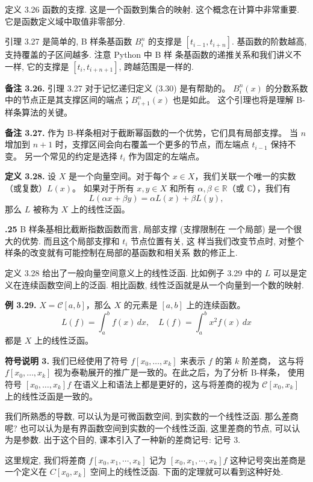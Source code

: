 \documentclass[a4paper]{ctexart}
\newcommand{\remark}[1]
{\noindent {\bf Remark {#1}}}
\begin{document}
{定义 3.26 函数的支撑. 这是一个函数到集合的映射. 这个概念在计算中非常重要. 
它是函数定义域中取值非零部分.

引理 3.27 是简单的, B 样条基函数 $B_i^n$ 的支撑是 $[t_{i - 1}, t_{i +
    n}]$. 基函数的阶数越高, 支持覆盖的子区间越多. 注意 Python 中 B 样
条基函数的递推关系和我们讲义不一样, 它的支撑是 $[t_i, t_{i + n + 1}]$,
跨越范围是一样的.

\noindent \textbf{备注 3.26.} 引理 3.27 对于记忆递归定义 (3.30) 是有帮助的。
$B_{i}^{n}(x)$ 的分数系数中的节点正是其支撑区间的端点；$B_{i+1}^{n}(x)$ 也是如此。
这个引理也将是理解 B-样条算法的关键。

\noindent \textbf{备注 3.27.} 作为 B-样条相对于截断幂函数的一个优势，它们具有局部支撑。
当 $n$ 增加到 $n + 1$ 时，支撑区间会向右覆盖一个更多的节点，而左端点 $t_{i-1}$ 保持不变。
另一个常见的约定是选择 $t_{i}$ 作为固定的左端点。

\noindent \textbf{定义 3.28.} 设 $X$ 是一个向量空间。对于每个 $x\in X$，我们关联一个唯一的实数（或复数）$L(x)$。
如果对于所有 $x, y\in X$ 和所有 $\alpha, \beta\in \mathbb{R}$（或 $\mathbb{C}$），我们有
\[
L(\alpha x + \beta y) = \alpha L(x) + \beta L(y),
\tag{3.36}
\]
那么 $L$ 被称为 $X$ 上的线性泛函。

{\bf \remark 3.25} B 样条基相比截断指数函数而言, 局部支撑 (支撑限制在
一个局部) 是一个很大的优势. 而且这个局部支撑和 $t_i$ 节点位置有关, 这
样当我们改变节点时, 对整个样条的改变就有可能控制在局部的基函数和相关系
数的修正上.

定义 3.28 给出了一般向量空间意义上的线性泛函. 比如例子 3.29 中的 $L$
可以是定义在连续函数空间上的泛函. 相比函数, 线性泛函就是从一个向量到一个数的映射. 

\noindent \textbf{例 3.29.} $X=\mathcal{C}[a, b]$，那么 $X$ 的元素是 $[a, b]$ 上的连续函数。
\[
L(f)=\int_{a}^{b} f(x) \, dx, \quad L(f)=\int_{a}^{b} x^{2} f(x) \, dx
\]
都是 $X$ 上的线性泛函。

\noindent \textbf{符号说明 3.} 我们已经使用了符号 $f[x_{0}, \ldots, x_{k}]$ 来表示 $f$ 的第 $k$ 阶差商，
这与将 $f[x_{0}, \ldots, x_{k}]$ 视为泰勒展开的推广是一致的。在此之后，为了分析 B-样条，
使用符号 $[x_{0}, \ldots, x_{k}]f$ 在语义上和语法上都是更好的，这与将差商的视为 $\mathcal{C}[x_{0}, x_{k}]$ 上的线性泛函是一致的。

我们所熟悉的导数, 可以认为是可微函数空间, 到实数的一个线性泛函. 那么差商呢? 
也可以认为是有界函数空间到实数的一个线性泛函, 这里差商的节点, 可以认为是参数. 
出于这个目的, 课本引入了一种新的差商记号: 记号 3. 

这里规定, 我们将差商 $f[x_0, x_1, \cdots, x_k]$ 记为 $[x_0, x_1,
  \cdots, x_k] f$ 这种记号突出差商是一个定义在 $C[x_0, x_k]$ 
空间上的线性泛函. 下面的定理就可以看到这种好处.

}
\end{document}
